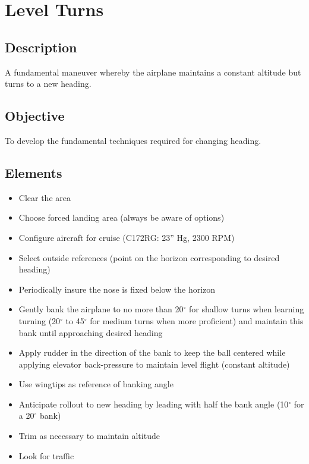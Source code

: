 \section{Level Turns}

\subsection{Description}

A fundamental maneuver whereby the airplane maintains a constant altitude but
turns to a new heading.

\subsection{Objective}

To develop the fundamental techniques required for changing heading.

\subsection{Elements}

\begin{itemize}
  \item Clear the area
  \item Choose forced landing area (always be aware of options) 
  \item Configure aircraft for cruise (C172RG: 23'' Hg, 2300 RPM)
  \item Select outside references (point on the horizon corresponding to desired heading)
  \item Periodically insure the nose is fixed below the horizon
  \item Gently bank the airplane to no more than 20$^\circ$ for shallow turns
    when learning turning (20$^\circ$ to 45$^\circ$ for medium turns when more
    proficient) and maintain this bank until approaching desired heading
  \item Apply rudder in the direction of the bank to keep the ball centered
    while applying elevator back-pressure to maintain level flight (constant
    altitude)
  \item Use wingtips as reference of banking angle
  \item Anticipate rollout to new heading by leading with half the bank angle
    (10$^\circ$ for a 20$^\circ$ bank)
  \item Trim as necessary to maintain altitude 
  \item Look for traffic
\end{itemize}

